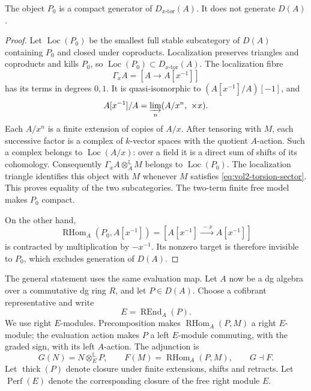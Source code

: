 \begin{proposition}\label{prop:vol2-torsion-generator}
The object \(P_0\) is a compact generator of
\(D_{x\text{-tor}}(A)\). It does not generate \(D(A)\).
\end{proposition}
\begin{proof}
Let \(\operatorname{Loc}(P_0)\) be the smallest full stable
subcategory of \(D(A)\) containing \(P_0\) and closed under
coproducts. Localization preserves triangles and coproducts and
kills \(P_0\), so
\(\operatorname{Loc}(P_0)\subset D_{x\text{-tor}}(A)\).
The localization fibre
\[
 \Gamma_xA=[A\longrightarrow A[x^{-1}]]
\]
has its terms in degrees \(0,1\). It is quasi-isomorphic to
\((A[x^{-1}]/A)[-1]\), and
\[
 A[x^{-1}]/A
 =\varinjlim_n(A/x^n,\ \times x).
\]
Each \(A/x^n\) is a finite extension of copies of \(A/x\).
After tensoring with \(M\), each successive factor is a complex
of \(k\)-vector spaces with the quotient \(A\)-action. Such a
complex belongs to \(\operatorname{Loc}(A/x)\): over a field
it is a direct sum of shifts of its cohomology. Consequently
\(\Gamma_xA\otimes_A^{\mathbb L}M\) belongs to
\(\operatorname{Loc}(P_0)\). The localization triangle identifies
this object with \(M\) whenever \(M\) satisfies
\eqref{eq:vol2-torsion-sector}. This proves equality of the two
subcategories. The two-term finite free model makes \(P_0\)
compact.

On the other hand,
\[
 \operatorname{RHom}_A(P_0,A[x^{-1}])
 =[A[x^{-1}]\xrightarrow{\ -x\ }A[x^{-1}]]
\]
is contracted by multiplication by \(-x^{-1}\). Its nonzero
target is therefore invisible to \(P_0\), which excludes
generation of \(D(A)\).
\end{proof}

The general statement uses the same evaluation map. Let \(A\)
now be a dg algebra over a commutative dg ring \(R\), and let
\(P\in D(A)\). Choose a cofibrant representative and write
\[
 E=\operatorname{REnd}_A(P).
\]
We use right \(E\)-modules. Precomposition makes
\(\operatorname{RHom}_A(P,M)\) a right \(E\)-module; the
evaluation action makes \(P\) a left \(E\)-module commuting,
with the graded sign, with its left \(A\)-action. The adjunction is
\begin{equation}\label{eq:vol2-morita-adjunction}
 G(N)=N\otimes_E^{\mathbb L}P,\qquad
 F(M)=\operatorname{RHom}_A(P,M),\qquad G\dashv F.
\end{equation}
Let \(\operatorname{thick}(P)\) denote closure under finite
extensions, shifts and retracts. Let \(\operatorname{Perf}(E)\)
denote the corresponding closure of the free right module \(E\).

